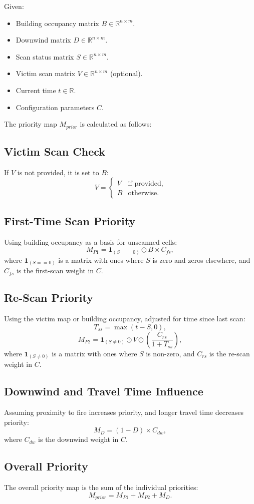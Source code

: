 \documentclass{article}
\begin{document}
Given:
\begin{itemize}
    \item Building occupancy matrix $B \in \mathbb{R}^{n \times m}$.
    \item Downwind matrix $D \in \mathbb{R}^{n \times m}$.
    \item Scan status matrix $S \in \mathbb{R}^{n \times m}$.
    \item Victim scan matrix $V \in \mathbb{R}^{n \times m}$ (optional).
    \item Current time $t \in \mathbb{R}$.
    \item Configuration parameters $C$.
\end{itemize}

The priority map $M_{prior}$ is calculated as follows:

\subsection*{Victim Scan Check}
If $V$ is not provided, it is set to $B$:
\[ V = \begin{cases} 
V & \text{if provided}, \\
B & \text{otherwise}.
\end{cases} \]

\subsection*{First-Time Scan Priority}
Using building occupancy as a basis for unscanned cells:
\[ M_{P1} = \mathbf{1}_{(S == 0)} \odot B \times C_{fs}, \]
where $\mathbf{1}_{(S == 0)}$ is a matrix with ones where $S$ is zero and zeros elsewhere, and $C_{fs}$ is the first-scan weight in $C$.

\subsection*{Re-Scan Priority}
Using the victim map or building occupancy, adjusted for time since last scan:
\[ T_{ss} = \max(t - S, 0), \]
\[ M_{P2} = \mathbf{1}_{(S \neq 0)} \odot V \odot \left( \frac{C_{rs}}{1 + T_{ss}} \right), \]
where $\mathbf{1}_{(S \neq 0)}$ is a matrix with ones where $S$ is non-zero, and $C_{rs}$ is the re-scan weight in $C$.

\subsection*{Downwind and Travel Time Influence}
Assuming proximity to fire increases priority, and longer travel time decreases priority:
\[ M_{D} = (1 - D) \times C_{dw}, \]
where $C_{dw}$ is the downwind weight in $C$.

\subsection*{Overall Priority}
The overall priority map is the sum of the individual priorities:
\[ M_{prior} = M_{P1} + M_{P2} + M_{D}. \]
\end{document}
